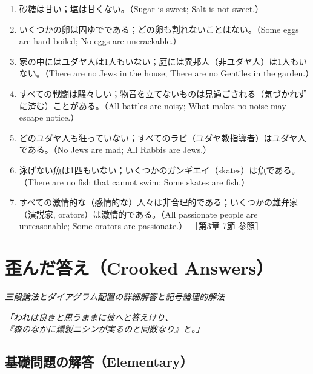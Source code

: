 \documentclass[a4paper,11pt,openany]{ltjsbook}
\begin{document}
\begin{enumerate}[label=\textbf{\arabic*.}, start=13]
\item 砂糖は甘い；塩は甘くない。（Sugar is sweet; Salt is not sweet.）
\item いくつかの卵は固ゆでである；どの卵も割れないことはない。（Some eggs are hard-boiled; No eggs are uncrackable.）
\item 家の中にはユダヤ人は1人もいない；庭には異邦人（非ユダヤ人）は1人もいない。（There are no Jews in the house; There are no Gentiles in the garden.）
\item すべての戦闘は騒々しい；物音を立てないものは見過ごされる（気づかれずに済む）ことがある。（All battles are noisy; What makes no noise may escape notice.）
\item どのユダヤ人も狂っていない；すべてのラビ（ユダヤ教指導者）はユダヤ人である。（No Jews are mad; All Rabbis are Jews.）
\item 泳げない魚は1匹もいない；いくつかのガンギエイ（skates）は魚である。（There are no fish that cannot swim; Some skates are fish.）
\item すべての激情的な（感情的な）人々は非合理的である；いくつかの雄弁家（演説家, orators）は激情的である。（All passionate people are unreasonable; Some orators are passionate.） \hfill {\small ［第3章 7節 参照］}
\end{enumerate}


\chapter{歪んだ答え（Crooked Answers）}
\label{ch:iii}

\begin{center}
\large\textit{三段論法とダイアグラム配置の詳細解答と記号論理的解法}
\end{center}
\vspace{4mm}

\begin{center}
\textit{「われは良きと思うままに彼へと答えけり、\\
『森のなかに燻製ニシンが実るのと同数なり』と。」}
\end{center}

\section{基礎問題の解答（Elementary）}
\end{document}
